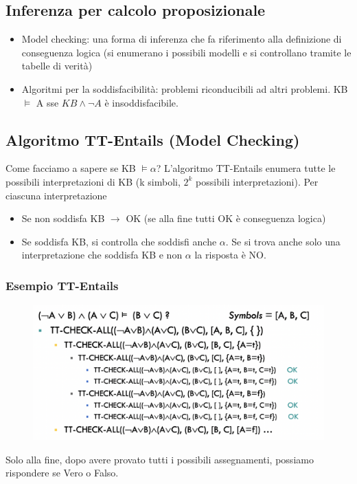 \documentclass{article}
\begin{document}
\subsection{Inferenza per calcolo proposizionale}
\begin{itemize}
    \item Model checking: una forma di inferenza che fa riferimento alla definizione di conseguenza logica (si enumerano i possibili modelli e si controllano tramite le tabelle di verità)
    \item Algoritmi per la soddisfacibilità: problemi riconducibili ad altri problemi. \newline KB $\models$ A sse $KB\land \neg A$ è insoddisfacibile.
\end{itemize}
\subsection{Algoritmo TT-Entails (Model Checking)}
Come facciamo a sapere se KB $\models \alpha$? L'algoritmo TT-Entails enumera tutte le possibili interpretazioni di KB (k simboli, $2^k$ possibili interpretazioni). Per ciascuna interpretazione 
\begin{itemize}
    \item Se non soddisfa KB $\to$ OK (se alla fine tutti OK è conseguenza logica)
    \item Se soddisfa KB, si controlla che soddisfi anche $\alpha$. Se si trova anche solo una interpretazione che soddisfa KB e non $\alpha$ la risposta è NO.
\end{itemize} 
\subsubsection{Esempio TT-Entails}
\begin{figure}[h!]
\centering
\includegraphics[scale=0.4]{Images/ttentailscheck.png}
\end{figure}
Solo alla fine, dopo avere provato tutti i possibili assegnamenti, possiamo rispondere se Vero o Falso.
\end{document}

